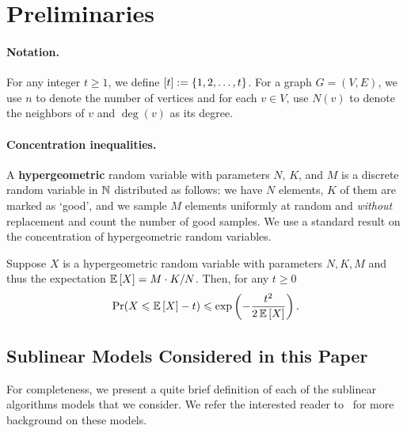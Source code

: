 
\newcommand{\degback}[1]{\ensuremath{\deg^{<}_{\pi}(#1)}}
\newcommand{\Nback}[1]{\ensuremath{N^{<}_{\pi}(#1)}}



\section{Preliminaries}\label{sec:prelim}

\paragraph{Notation.} For any integer $t \geq 1$, we define $[t] := \left\{ 1,2,\ldots,t \right\}$. For a graph $G=(V,E)$, we use $n$ to denote the number of vertices and for each $v \in V$, use $N(v)$ to denote the neighbors of $v$ and $\deg(v)$ as its degree. 

\paragraph{Concentration inequalities.} 

A \textbf{hypergeometric} random variable with parameters $N$, $K$, and $M$ is a discrete random variable in $\mathbb{N}$ distributed as follows: we have $N$ elements, $K$ of them are marked as `good', 
and we sample $M$ elements uniformly at random and \emph{without} replacement and count the number of good samples. We use a standard result on the concentration of hypergeometric 
random variables. 

\begin{proposition}\label{thm:book}
Suppose $X$ is a hypergeometric random variable with parameters $N,K,M$ and thus the expectation $\operatorname*{{\mathbb{E}}}\left[X\right] = M \cdot K/N$. Then, for any $t \geq 0$
\[
\operatorname*{\textnormal{Pr}}(X \leqslant \operatorname*{{\mathbb{E}}}\left[X\right]-t) \leqslant \exp\left(-\frac{t^2}{2\operatorname*{{\mathbb{E}}}\left[X\right]}\right).
\]
\end{proposition}

\subsection{Sublinear Models Considered in this Paper}\label{sec:sublinear}

For completeness, we present a quite brief definition of each of the sublinear algorithms models that we consider. We refer the interested reader to~\cite{AssadiCK19} for more background on these models. 

